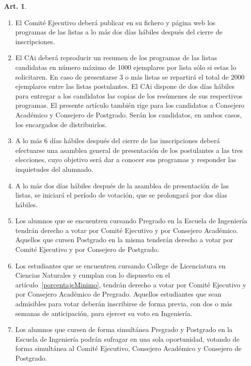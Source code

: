 \documentclass[letterpaper,11pt]{article}
\theoremstyle{definition}%
\newtheorem{art}{Art.} %
\begin{document}
\begin{art}
\begin{enumerate}
		\item El Comité Ejecutivo deberá publicar en su fichero y página web los programas de las listas a lo más dos días hábiles después del cierre de inscripciones.

		\item El CAi deberá reproducir un resumen de los programas de las listas candidatas en número máximo de 1000 ejemplares por lista sólo si estas lo solicitaren. En caso de presentarse 3 o más listas se repartirá el total de 2000 ejemplares entre las listas postulantes. El CAi dispone de dos días hábiles para entregar a los candidatos las copias de los resúmenes de sus respectivos programas. El presente artículo también rige para los candidatos a Consejero Académico y Consejero de Postgrado. Serán los candidatos, en ambos casos, los encargados de distribuirlos.

		\item A lo más 6 días hábiles después del cierre de las inscripciones deberá efectuarse una asamblea general de presentación de los postulantes a las tres elecciones, cuyo objetivo será dar a conocer sus programas y responder las inquietudes del alumnado.

		\item \label{periodo}A lo más dos días hábiles después de la asamblea de presentación de las listas, se iniciará el período de votación, que se prolongará por dos días hábiles.

		\item \label{votantes}Los alumnos que se encuentren cursando Pregrado en la Escuela de Ingeniería tendrán derecho a votar por Comité Ejecutivo y por Consejero Académico. Aquellos que cursen Postgrado en la misma tenderán derecho a votar por Comité Ejecutivo y por Consejero de Postgrado.

		\item \label{votantesCollege} Los estudiantes que se encuentren cursando College de Licenciatura en Ciencias Naturales y cumplan con lo dispuesto en el artículo~\ref{porcentajeMinimo}, tendrán derecho a votar por Comité Ejecutivo y por Consejero Académico de Pregrado. Aquellos estudiantes que sean admisibles para votar deberán inscribirse de forma previa, con dos o más semanas de anticipación, para ejercer su voto en Ingeniería.

		\item Los alumnos que cursen de forma simultánea Pregrado y Postgrado en la Escuela de Ingeniería podrán sufragar en una sola oportunidad, votando de forma simultánea al Comité Ejecutivo, Consejero Académico y Consejero de Postgrado.


\end{enumerate}
\end{art}
\end{document}

